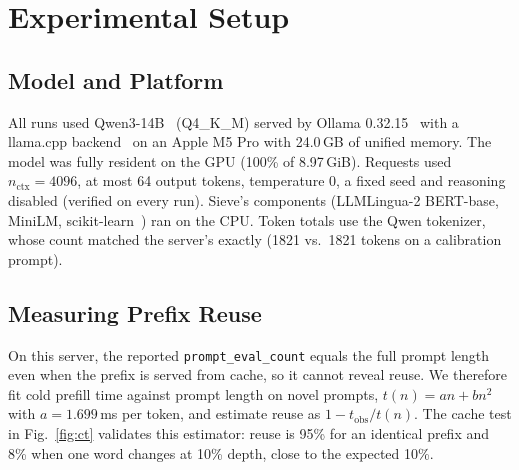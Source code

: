 \documentclass[journal]{IEEEtran}
\begin{document}
\section{Experimental Setup}
\subsection{Model and Platform}
All runs used Qwen3-14B~\cite{qwen3} (Q4\_K\_M) served by Ollama 0.32.15~\cite{ollama} with a llama.cpp
backend~\cite{llamacpp} on an Apple M5 Pro with 24.0\,GB of unified memory. The model was fully resident
on the GPU (100\% of 8.97\,GiB). Requests used
$n_\text{ctx}=4096$, at most 64 output tokens, temperature 0, a fixed seed and reasoning disabled
(verified on every run). Sieve's components (LLMLingua-2 BERT-base, MiniLM, scikit-learn~\cite{pedregosa2011sklearn}) ran on the CPU.
Token totals use the Qwen tokenizer, whose count matched the server's exactly (1821 vs.\
1821 tokens on a calibration prompt).

\subsection{Measuring Prefix Reuse}
On this server, the reported \texttt{prompt\_eval\_count} equals the full prompt length even when the prefix is served from cache, so it cannot
reveal reuse. We therefore fit cold prefill time against prompt length on novel prompts, $t(n)=an+bn^2$ with $a=1.699$\,ms per token, and
estimate reuse as $1-t_\text{obs}/t(n)$. The cache test in Fig.~\ref{fig:ct} validates this estimator: reuse is 95\% for an
identical prefix and 8\% when one word changes at 10\% depth, close to the expected 10\%.
\end{document}
